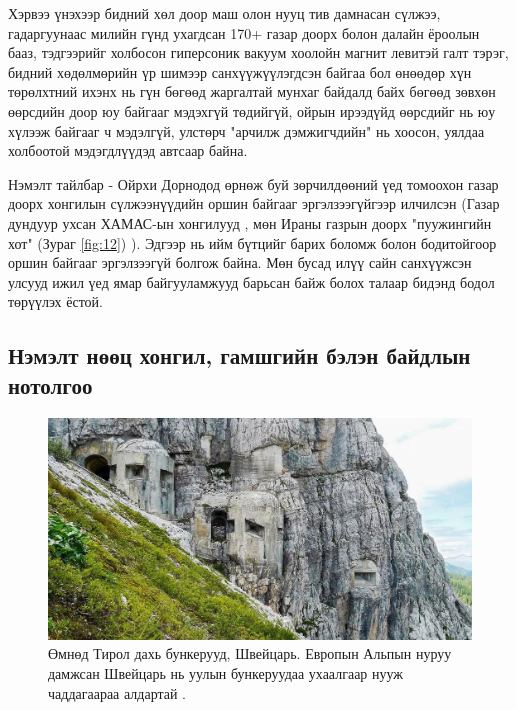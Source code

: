 \documentclass[10pt,twocolumn,letterpaper]{article}
\begin{document}
Хэрвээ үнэхээр бидний хөл доор маш олон нууц тив дамнасан сүлжээ, гадаргуунаас милийн гүнд ухагдсан 170+ газар доорх болон далайн ёроолын бааз, тэдгээрийг холбосон гиперсоник вакуум хоолойн магнит левитэй галт тэрэг, бидний хөдөлмөрийн үр шимээр санхүүжүүлэгдсэн байгаа бол өнөөдөр хүн төрөлхтний ихэнх нь гүн бөгөөд жаргалтай мунхаг байдалд байх бөгөөд зөвхөн өөрсдийн доор юу байгааг мэдэхгүй төдийгүй, ойрын ирээдүйд өөрсдийг нь юу хүлээж байгааг ч мэдэлгүй, улстөрч "арчилж дэмжигчдийн" нь хоосон, уялдаа холбоотой мэдэгдлүүдэд автсаар байна.

Нэмэлт тайлбар - Ойрхи Дорнодод өрнөж буй зөрчилдөөний үед томоохон газар доорх хонгилын сүлжээнүүдийн оршин байгааг эргэлзээгүйгээр илчилсэн (Газар дундуур ухсан ХАМАС-ын хонгилууд \cite{38}, мөн Ираны газрын доорх "пуужингийн хот" (Зураг \ref{fig:12}) \cite{39,40}). Эдгээр нь ийм бүтцийг барих боломж болон бодитойгоор оршин байгааг эргэлзээгүй болгож байна. Мөн бусад илүү сайн санхүүжсэн улсууд ижил үед ямар байгууламжууд барьсан байж болох талаар бидэнд бодол төрүүлэх ёстой.

\subsection{Нэмэлт нөөц хонгил, гамшгийн бэлэн байдлын нотолгоо}

\begin{figure}[t]
\begin{center}
\includegraphics[width=1\linewidth]{tyrol.jpg}
\end{center}
\caption{Өмнөд Тирол дахь бункерууд, Швейцарь. Европын Альпын нуруу дамжсан Швейцарь нь уулын бункеруудаа ухаалгаар нууж чаддагаараа алдартай \cite{32}.}
\label{fig:7}
\label{fig:onecol}
\end{figure}
\end{document}
